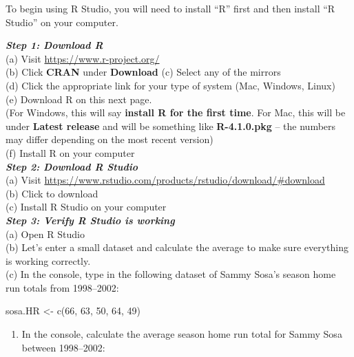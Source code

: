\documentclass[
  11pt,
]{book}
\newenvironment{Shaded}{\begin{snugshade}}{\end{snugshade}}
\newcommand{\DecValTok}[1]{\textcolor[rgb]{0.00,0.00,0.81}{#1}}
\newcommand{\FunctionTok}[1]{\textcolor[rgb]{0.00,0.00,0.00}{#1}}
\newcommand{\NormalTok}[1]{#1}
\newcommand{\OtherTok}[1]{\textcolor[rgb]{0.56,0.35,0.01}{#1}}
\providecommand{\tightlist}{%
  \setlength{\itemsep}{0pt}\setlength{\parskip}{0pt}}
\theoremstyle{definition}
\theoremstyle{definition}
\theoremstyle{definition}
\theoremstyle{definition}
\theoremstyle{remark}
\begin{document}
To begin using R Studio, you will need to install ``R'' first and then install ``R Studio'' on your computer.

\textbf{\emph{Step 1: Download R}}\\
(a) Visit \url{https://www.r-project.org/}\\
(b) Click \textbf{CRAN} under \textbf{Download}
(c) Select any of the mirrors\\
(d) Click the appropriate link for your type of system (Mac, Windows, Linux)\\
(e) Download R on this next page.\\
(For Windows, this will say \textbf{install R for the first time}. For Mac, this will be under \textbf{Latest release} and will be something like \textbf{R-4.1.0.pkg} -- the numbers may differ depending on the most recent version)\\
(f) Install R on your computer\\

\textbf{\emph{Step 2: Download R Studio}}\\
(a) Visit \url{https://www.rstudio.com/products/rstudio/download/\#download}\\
(b) Click to download\\
(c) Install R Studio on your computer\\

\textbf{\emph{Step 3: Verify R Studio is working}}\\
(a) Open R Studio\\
(b) Let's enter a small dataset and calculate the average to make sure everything is working correctly.\\
(c) In the console, type in the following dataset of Sammy Sosa's season home run totals from 1998--2002:\\

\begin{Shaded}
\begin{Highlighting}[]
\NormalTok{sosa.HR }\OtherTok{\textless{}{-}} \FunctionTok{c}\NormalTok{(}\DecValTok{66}\NormalTok{, }\DecValTok{63}\NormalTok{, }\DecValTok{50}\NormalTok{, }\DecValTok{64}\NormalTok{, }\DecValTok{49}\NormalTok{)}
\end{Highlighting}
\end{Shaded}

\begin{enumerate}
\def\labelenumi{(\alph{enumi})}
\setcounter{enumi}{3}
\tightlist
\item
  In the console, calculate the average season home run total for Sammy Sosa between 1998--2002:\\
\end{enumerate}
\end{document}
